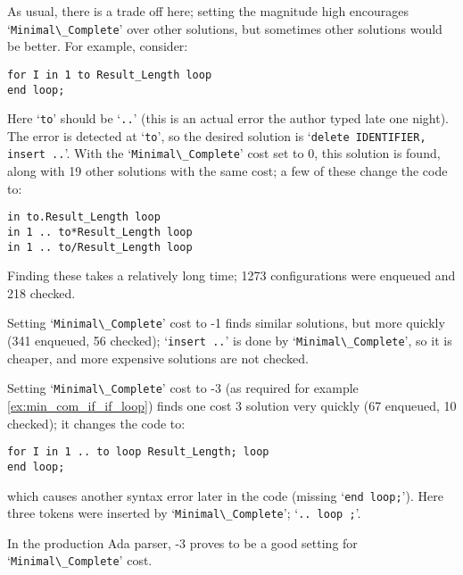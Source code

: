 \documentclass{article}
\newcommand{\code}[1]{`\lstinline|#1|'}
\begin{document}
As usual, there is a trade off here; setting the magnitude high
encourages \code{Minimal\_Complete} over other solutions, but sometimes
other solutions would be better. For example, consider:
\begin{lstlisting}
for I in 1 to Result_Length loop
end loop;
\end{lstlisting}
Here \code{to} should be \code{..} (this is an actual error the author
typed late one night). The error is detected at \code{to}, so the
desired solution is \code{delete IDENTIFIER, insert ..}. With the
\code{Minimal\_Complete} cost set to 0, this solution is found, along
with 19 other solutions with the same cost; a few of these change the
code to:

\begin{lstlisting}
in to.Result_Length loop
in 1 .. to*Result_Length loop
in 1 .. to/Result_Length loop
\end{lstlisting}

Finding these takes a relatively long time; 1273 configurations
were enqueued and 218 checked.

Setting \code{Minimal\_Complete} cost to -1 finds similar solutions,
but more quickly (341 enqueued, 56 checked); \code{insert ..} is done
by \code{Minimal\_Complete}, so it is cheaper, and more expensive
solutions are not checked.

Setting \code{Minimal\_Complete} cost to -3 (as required for
example \ref{ex:min_com_if_if_loop}) finds one cost 3 solution very
quickly (67 enqueued, 10 checked); it changes the code to:
\begin{lstlisting}
for I in 1 .. to loop Result_Length; loop
end loop;
\end{lstlisting}
which causes another syntax error later in the code (missing
\code{end loop;}). Here three tokens were inserted by
\code{Minimal\_Complete}; \code{.. loop ;}.

In the production Ada parser, -3 proves to be a good setting for
\code{Minimal\_Complete} cost.
\end{document}

